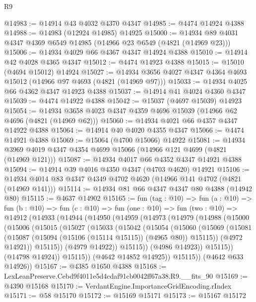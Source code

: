\begin{lexlean}{R9}
\begin{coremodule}
@14983 := @14914 @43 @4032 @4370 @4347
@14985 := @4474 @14924 @4388
@14988 := @14983 (@12924 @14985) @14925
@15000 := @14934 @89 @4031 @4347 @4369 @6549 @14985 (@14966 @23 @6549 (@4821 (@14969 @23)))
@15006 := @14934 @4029 @66 @4367 @4347 @14924 @4388
@15010 := @14914 @42 @4028 @4365 @4347
@15012 := @4474 @14923 @4388
@15015 := @15010 (@4694 @15012) @14924
@15027 := @14934 @3656 @4027 @4347 @4364 @4693 @15012 (@14966 @97 @4693 (@4821 (@14969 @97)))
@15033 := @14934 @4025 @66 @4362 @4347 @14923 @4388
@15037 := @14914 @41 @4024 @4360 @4347
@15039 := @4474 @14922 @4388
@15042 := @15037 (@4697 @15039) @14923
@15054 := @14934 @3658 @4023 @4347 @4359 @4696 @15039 (@14966 @62 @4696 (@4821 (@14969 @62)))
@15060 := @14934 @4021 @66 @4357 @4347 @14922 @4388
@15064 := @14914 @40 @4020 @4355 @4347
@15066 := @4474 @14921 @4388
@15069 := @15064 (@4700 @15066) @14922
@15081 := @14934 @3969 @4019 @4347 @4354 @4699 @15066 (@14966 @121 @4699 (@4821 (@14969 @121)))
@15087 := @14934 @4017 @66 @4352 @4347 @14921 @4388
@15094 := @14914 @39 @4016 @4350 @4347 (@4703 @4620) @14921
@15106 := @14934 @4014 @83 @4347 @4349 @4702 @4620 (@14966 @141 @4702 (@4821 (@14969 @141)))
@15114 := @14934 @81 @66 @4347 @4347 @80 @4388 (@14942 @80)
@15115 := @4637 @14902
@15165 := fun (tag : @10) =>
  fun (a : @10) =>
  fun (b : @10) =>
  fun (c : @10) =>
  fun (one : @10) =>
  fun (two : @10) =>
  @14912
    (@14933
      (@14944
        (@14950
          (@14959
            (@14973
              (@14979
                (@14988
                  (@15000
                    (@15006
                      (@15015
                        (@15027
                          (@15033
                            (@15042
                              (@15054
                                (@15060
                                  (@15069
                                    (@15081
                                      (@15087 (@15094 (@15106 (@15114 @15115)) (@4965 @80)) @15115))
                                    (@4972 @14921))
                                  @15115))
                              (@4979 @14922))
                            @15115))
                        (@4986 @14923))
                      @15115))
                  (@14798 @14924))
                @15115))
            (@4642 @14852 @14925))
          @15115))
      (@4642 @633 @14926))
@15167 := @4385 @1650 @4388
@15168 := LexLeanPreserve.Cebd9f4011e5d4cdaf91cb0042ff67a38.R9.__fits_90
@15169 := @4390 @15168
@15170 := VerdantEngine.ImportanceGridEncoding.rIndex
@15171 := @58 @15170
@15172 := @15169 @15171
@15173 := @15167 @15172

\end{coremodule}
\end{lexlean}
